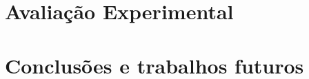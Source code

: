 \documentclass[
	12pt,				%
    oneside,
	a4paper,			%
	chapter=TITLE,		%
	english,			%
	brazil				%
	]{abntex2}
\begin{document}
%

\chapter{Avaliação Experimental}


\chapter{Conclusões e trabalhos futuros}



%


\addto\captionsportuguese{\renewcommand{\bibname}{Reference}}
\renewcommand{\bibname}{Referências}


\printindex
\end{document}
